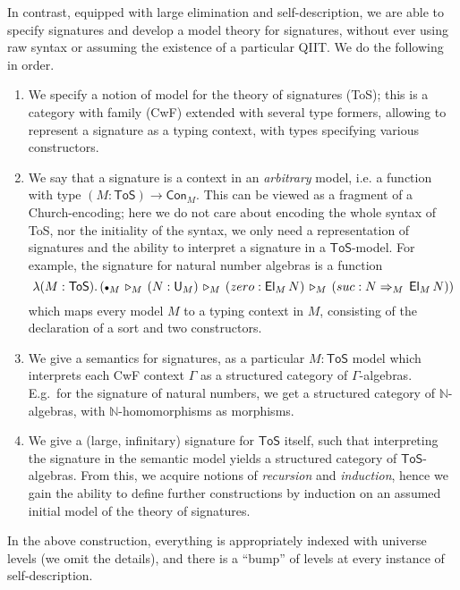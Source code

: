 \documentclass{easychair}
\newcommand{\emptycon}{\scaleobj{.75}\bullet}
\newcommand{\ext}{\triangleright}
\newcommand{\arri}{\Rightarrow}
\begin{document}
In contrast, equipped with large elimination and self-description, we are able
to specify signatures and develop a model theory for signatures, without ever
using raw syntax or assuming the existence of a particular QIIT. We do the
following in order.
\begin{enumerate}
  \item
  We specify a notion of model for the theory of signatures (ToS); this is a
  category with family (CwF) extended with several type formers, allowing to
  represent a signature as a typing context, with types specifying various
  constructors.
  \item We say that a signature is a context in an \emph{arbitrary} model, i.e.
    a function with type $(M : \mathsf{ToS})\to\mathsf{Con}_M$. This can be
    viewed as a fragment of a Church-encoding; here we do not care about
    encoding the whole syntax of ToS, nor the initiality of the syntax, we only
    need a representation of signatures and the ability to interpret a signature
    in a $\mathsf{ToS}$-model. For example, the signature for natural number
    algebras is a function
    \[
    \lambda(M : \mathsf{ToS}).\,(\emptycon_M\,\ext_M\,(N : \mathsf{U}_M)\,\ext_M\,(zero : \mathsf{El}_M\,N)\,\ext_M\,(suc : N\arri_M\,\mathsf{El}_M\,N))
    \]
    which maps every model $M$ to a typing context in $M$, consisting of the
    declaration of a sort and two constructors.

  \item We give a semantics for signatures, as a particular $M : \mathsf{ToS}$
    model which interprets each CwF context $\Gamma$ as a structured category of
    $\Gamma$-algebras. E.g.\ for the signature of natural numbers, we get a
    structured category of $\mathbb{N}$-algebras, with
    $\mathbb{N}$-homomorphisms as morphisms.
  \item We give a (large, infinitary) signature for $\mathsf{ToS}$ itself, such
    that interpreting the signature in the semantic model yields a structured
    category of $\mathsf{ToS}$-algebras. From this, we acquire notions of
    \emph{recursion} and \emph{induction}, hence we gain the ability to define
    further constructions by induction on an assumed initial model of the theory
    of signatures.
\end{enumerate}
In the above construction, everything is appropriately indexed with universe
levels (we omit the details), and there is a ``bump'' of levels at every
instance of self-description.
\end{document}
